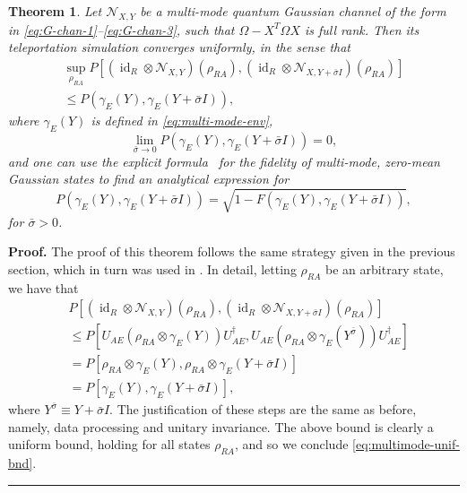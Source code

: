 \documentclass[apsrev,twocolumn]{revtex4-1}%
\newtheorem{theorem}{Theorem}
\newenvironment{proof}[1][Proof]{\noindent\textbf{#1.} }{\ \rule{0.5em}{0.5em}}
\begin{document}
\begin{theorem}
Let $\mathcal{N}_{X,Y}$ be a multi-mode quantum Gaussian channel of the form in
\eqref{eq:G-chan-1}--\eqref{eq:G-chan-3}, such that $\Omega-X^{T}\Omega X$ is
full rank. Then its teleportation simulation converges uniformly, in the sense
that%
\begin{multline}
\sup_{\rho_{RA}}P[(\operatorname{id}_{R}\otimes\mathcal{N}_{X,Y})(\rho
_{RA}),(\operatorname{id}_{R}\otimes\mathcal{N}_{X,Y+\bar{\sigma}I})(\rho
_{RA})]\label{eq:multimode-unif-bnd}\\
\leq P(\gamma_{E}(Y),\gamma_{E}(Y+\bar{\sigma}I)),
\end{multline}
where $\gamma_{E}(Y)$ is defined in \eqref{eq:multi-mode-env},
\begin{equation}
\lim_{\bar{\sigma}\rightarrow0}P(\gamma_{E}(Y),\gamma_{E}(Y+\bar
{\sigma}I))=0,
\end{equation}
and one can use the explicit formula \cite[Section~IV]%
{PS00}\ for the fidelity of multi-mode, zero-mean Gaussian states to find an analytical expression for
\begin{equation}
P(\gamma_{E}(Y),\gamma_{E}(Y+\bar{\sigma}I))=\sqrt{1-F(\gamma_{E}%
(Y),\gamma_{E}(Y+\bar{\sigma}I))},
\end{equation}
for $\bar{\sigma}>0$.
\end{theorem}

\begin{proof}
The proof of this theorem follows the same strategy given in the previous
section, which in turn was used in \cite{TW16,SWAT17}. In detail, letting $\rho_{RA}$ be an arbitrary state, we have that%
\begin{align}
& P[(\operatorname{id}_{R}\otimes\mathcal{N}_{X,Y})(\rho_{RA}%
),(\operatorname{id}_{R}\otimes\mathcal{N}_{X,Y+\bar{\sigma}I})(\rho
_{RA})]\nonumber\\
& \leq P[U_{AE}(\rho_{RA}\otimes\gamma_{E}(Y))U_{AE}^{\dag},U_{AE}(\rho
_{RA}\otimes\gamma_{E}(Y^{\bar{\sigma}}))U_{AE}^{\dag}]\nonumber\\
& =P[\rho_{RA}\otimes\gamma_{E}(Y),\rho_{RA}\otimes\gamma_{E}(Y+\bar{\sigma
}I)]\nonumber\\
& =P[\gamma_{E}(Y),\gamma_{E}(Y+\bar{\sigma}I)],
\end{align}
where $Y^{\bar{\sigma}}\equiv Y+\bar{\sigma}I$. The justification of these
steps are the same as before, namely, data processing and unitary invariance.
The above bound is clearly a uniform bound, holding for all states $\rho_{RA}%
$, and so we conclude \eqref{eq:multimode-unif-bnd}.
\end{proof}
\end{document}
